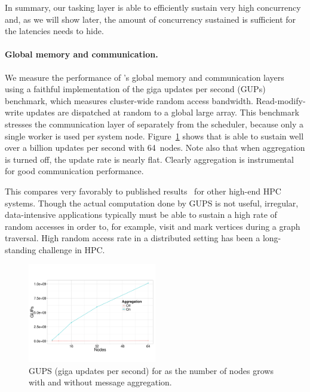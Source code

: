 In summary, our tasking layer is able to efficiently sustain very high
concurrency and, as we will show later, the amount of concurrency sustained is
sufficient for the latencies \Grappa needs to hide.

\paragraph{Global memory and communication.} We measure the performance of
\Grappa's global memory and communication layers using a faithful
implementation of the giga updates per second (GUPs) benchmark, which
measures cluster-wide random access bandwidth.  Read-modify-write
updates are dispatched at random to a global large array. This benchmark
stresses the communication layer of \Grappa separately from the
scheduler, because only a single worker is used per system node.
Figure~\ref{fig:grappa-gups} shows that \Grappa is able to sustain
well over a billion updates per second with 64~nodes. Note also that
when aggregation is turned off, the update rate is nearly
flat. Clearly aggregation is instrumental for good communication
performance.

This compares very favorably to published results~\cite{gups} for other
high-end HPC systems. Though the actual computation done by GUPS is not 
useful, irregular, data-intensive applications typically must be able to
sustain a high rate of random accesses in order to, for example, visit and
mark vertices during a graph traversal. High random access rate in a
distributed setting has been a long-standing challenge in HPC.

\begin{figure}[ht]
    \begin{center}
      \includegraphics[width=0.5\textwidth]{figs/gups.pdf}
    \end{center}
    \caption{GUPS (giga updates per second) for \Grappa as the number of nodes grows with and without message aggregation.}
    \label{fig:grappa-gups}
\end{figure}

